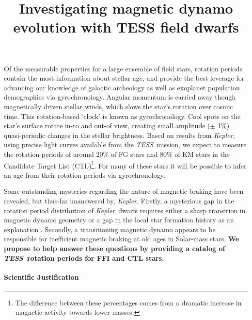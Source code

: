 \documentclass[letterpaper,12pt,preprint]{hack_aastex}
\newcommand{\Kepler}{{\it Kepler}}
\newcommand{\kepler}{\Kepler}
\newcommand{\TESS}{{\it TESS}}
\begin{document}
\title{Investigating magnetic dynamo evolution with TESS field dwarfs}

Of the measurable properties for a large ensemble of field stars, rotation
periods contain the most information about stellar age, and provide the best
leverage for advancing our knowledge of galactic archeology as well as
exoplanet population demographics via gyrochronology.
Angular momentum is carried away though magnetically driven stellar winds,
which slows the star's rotation over cosmic time.
This rotation-based `clock' is known as gyrochronology.
Cool spots on the star's surface rotate in-to and out-of view, creating small
amplitude ($\pm$ 1\%) quasi-periodic changes in the stellar brightness.
Based on results from \Kepler, using precise light curves available from the
\TESS\ mission, we expect to measure the rotation periods of around 20\% of FG
stars and 80\% of KM stars in the Candidate Target List (CTL)\footnote{The
difference between these percentages comes from a dramatic increase in
magnetic activity towards lower masses.}.
For many of these stars it will be possible to infer an age from their
rotation periods via gyrochronology.

Some outstanding mysteries regarding the nature of magnetic braking have been
revealed, but thus-far unanswered by, \kepler.
Firstly, a mysterious gap in the rotation period distribution of \Kepler\
dwarfs requires either a sharp transition in magnetic dynamo geometry or a gap
in the local star formation history as an explanation \citep{mcquillan2014,
davenport2017}.
Secondly, a transitioning magnetic dynamo appears to be responsible for
inefficient magnetic braking at old ages in Solar-mass stars.
{\bf We propose to help answer these questions by providing a catalog of \TESS\
rotation periods for FFI and CTL stars.}

\paragraph{Scientific Justification}
\end{document}
